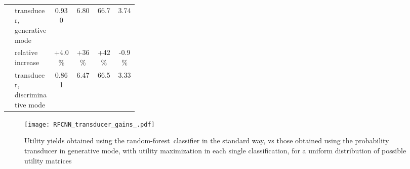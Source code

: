 \documentclass[\ifafour a4paper,12pt,\else a5paper,10pt,\fi%
onecolumn,oneside,article,%
british%
]{memoir}
\theoremstyle{remark}
\theoremstyle{innote}
\renewcommand*{\|}[1][]{\nonscript\:#1\vert\nonscript\:\mathopen{}}
\newcommand*{\rf}{random-forest}
\begin{document}
\begin{table}[!t]
\begin{tabular}{cp{0.3\linewidth}cccc}
 &\parbox{\linewidth}{\color{mypurpleblue}transducer,\\ generative mode}
 &\textcolor{mypurpleblue}{0.930}
 &\textcolor{mypurpleblue}{6.80}
 &\textcolor{mypurpleblue}{66.7}
 &\textcolor{mypurpleblue}{3.74}
 \\[1\jot]
 &\footnotesize relative increase
 &\footnotesize+4.0\%
 &\footnotesize+36\%
 &\footnotesize+42\%
 &\footnotesize-0.9\%
 \\[1\jot]
 &\parbox{\linewidth}{\color{myyellow}\scriptsize transducer,\\ discriminative mode}
 &\textcolor{myyellow}{\scriptsize 0.861}
 &\textcolor{myyellow}{\scriptsize 6.47}
 &\textcolor{myyellow}{\scriptsize 66.5}
 &\textcolor{myyellow}{\scriptsize 3.33}
 \end{tabular}
\end{table}
\fi



\iffalse
\begin{figure}[t]
  \centering
  \texttt{[image: RFCNN\_transducer\_gains\_.pdf]}\\
  \caption{Utility yields obtained using the \rf\ classifier in the standard way, vs those obtained using the probability transducer in generative mode, with utility maximization in each single classification, for a uniform distribution of possible utility matrices}
  \label{fig:RF_gain_gener_UMspace}
\end{figure}
\end{document}
